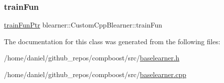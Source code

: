 \mbox{\label{classblearner_1_1_custom_cpp_blearner_ac4dd33045cf6c5d0272414325933da9c}} 
\subsubsection{\texorpdfstring{train\+Fun}{trainFun}}
{\footnotesize\ttfamily \hyperlink{namespaceblearner_a5e2b38edf05e32681bee136af9ae505d}{train\+Fun\+Ptr} blearner\+::\+Custom\+Cpp\+Blearner\+::train\+Fun\hspace{0.3cm}{\ttfamily [private]}}



The documentation for this class was generated from the following files\+:\begin{DoxyCompactItemize}
\item 
/home/daniel/github\+\_\+repos/compboost/src/\hyperlink{baselearner_8h}{baselearner.\+h}\item 
/home/daniel/github\+\_\+repos/compboost/src/\hyperlink{baselearner_8cpp}{baselearner.\+cpp}\end{DoxyCompactItemize}
